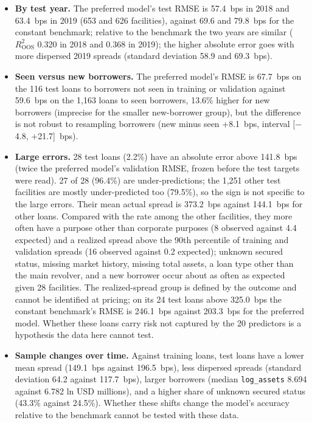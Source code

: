 \documentclass[9pt,letterpaper]{extarticle}
\begin{document}
\begin{itemize}
  \item \textbf{By test year.} The preferred model's test RMSE is 57.4~bps in 2018 and 63.4~bps in 2019 (653 and 626 facilities), against 69.6 and 79.8~bps for the constant benchmark; relative to the benchmark the two years are similar ($R^2_{\mathrm{OOS}}$ 0.320 in 2018 and 0.368 in 2019); the higher absolute error goes with more dispersed 2019 spreads (standard deviation 58.9 and 69.3~bps).
  \item \textbf{Seen versus new borrowers.} The preferred model's RMSE is 67.7~bps on the 116 test loans to borrowers not seen in training or validation against 59.6~bps on the 1,163 loans to seen borrowers, 13.6\% higher for new borrowers (imprecise for the smaller new-borrower group), but the difference is not robust to resampling borrowers (new minus seen +8.1~bps, interval [$-$4.8, +21.7]~bps).
  \item \textbf{Large errors.} 28 test loans (2.2\%) have an absolute error above 141.8~bps (twice the preferred model's validation RMSE, frozen before the test targets were read). 27 of 28 (96.4\%) are under-predictions; the 1,251 other test facilities are mostly under-predicted too (79.5\%), so the sign is not specific to the large errors. Their mean actual spread is 373.2~bps against 144.1~bps for other loans. Compared with the rate among the other facilities, they more often have a purpose other than corporate purposes (8 observed against 4.4 expected) and a realized spread above the 90th percentile of training and validation spreads (16 observed against 0.2 expected); unknown secured status, missing market history, missing total assets, a loan type other than the main revolver, and a new borrower occur about as often as expected given 28 facilities. The realized-spread group is defined by the outcome and cannot be identified at pricing; on its 24 test loans above 325.0~bps the constant benchmark's RMSE is 246.1~bps against 203.3~bps for the preferred model. Whether these loans carry risk not captured by the 20 predictors is a hypothesis the data here cannot test.
  \item \textbf{Sample changes over time.} Against training loans, test loans have a lower mean spread (149.1~bps against 196.5~bps), less dispersed spreads (standard deviation 64.2 against 117.7~bps), larger borrowers (median \texttt{log\_assets} 8.694 against 6.782 ln USD millions), and a higher share of unknown secured status (43.3\% against 24.5\%). Whether these shifts change the model's accuracy relative to the benchmark cannot be tested with these data.

\end{itemize}
\end{document}
